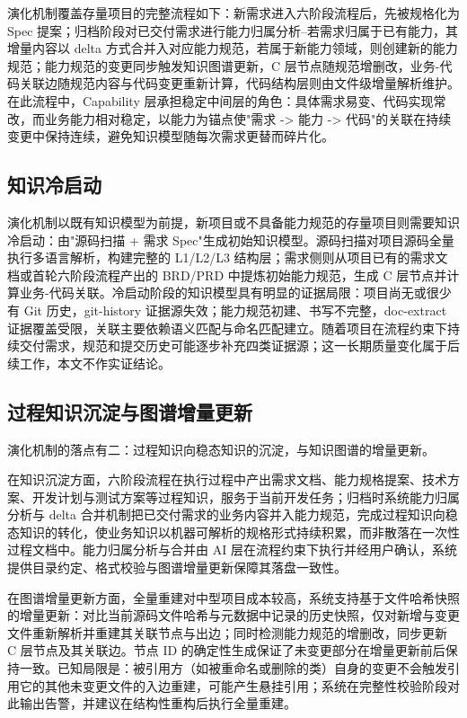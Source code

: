 演化机制覆盖存量项目的完整流程如下：新需求进入六阶段流程后，先被规格化为 Spec 提案；归档阶段对已交付需求进行能力归属分析--若需求归属于已有能力，其增量内容以 delta 方式合并入对应能力规范，若属于新能力领域，则创建新的能力规范；能力规范的变更同步触发知识图谱更新，C 层节点随规范增删改，业务-代码关联边随规范内容与代码变更重新计算，代码结构层则由文件级增量解析维护。在此流程中，Capability 层承担稳定中间层的角色：具体需求易变、代码实现常改，而业务能力相对稳定，以能力为锚点使"需求 -> 能力 -> 代码"的关联在持续变更中保持连续，避免知识模型随每次需求更替而碎片化。


\subsection{知识冷启动}
演化机制以既有知识模型为前提，新项目或不具备能力规范的存量项目则需要知识冷启动：由"源码扫描 + 需求 Spec"生成初始知识模型。源码扫描对项目源码全量执行多语言解析，构建完整的 L1/L2/L3 结构层；需求侧则从项目已有的需求文档或首轮六阶段流程产出的 BRD/PRD 中提炼初始能力规范，生成 C 层节点并计算业务-代码关联。冷启动阶段的知识模型具有明显的证据局限：项目尚无或很少有 Git 历史，git-history 证据源失效；能力规范初建、书写不完整，doc-extract 证据覆盖受限，关联主要依赖语义匹配与命名匹配建立。随着项目在流程约束下持续交付需求，规范和提交历史可能逐步补充四类证据源；这一长期质量变化属于后续工作，本文不作实证结论。


\subsection{过程知识沉淀与图谱增量更新}
演化机制的落点有二：过程知识向稳态知识的沉淀，与知识图谱的增量更新。

在知识沉淀方面，六阶段流程在执行过程中产出需求文档、能力规格提案、技术方案、开发计划与测试方案等过程知识，服务于当前开发任务；归档时系统能力归属分析与 delta 合并机制把已交付需求的业务内容并入能力规范，完成过程知识向稳态知识的转化，使业务知识以机器可解析的规格形式持续积累，而非散落在一次性过程文档中。能力归属分析与合并由 AI 层在流程约束下执行并经用户确认，系统提供目录约定、格式校验与图谱增量更新保障其落盘一致性。

在图谱增量更新方面，全量重建对中型项目成本较高，系统支持基于文件哈希快照的增量更新：对比当前源码文件哈希与元数据中记录的历史快照，仅对新增与变更文件重新解析并重建其关联节点与出边；同时检测能力规范的增删改，同步更新 C 层节点及其关联边。节点 ID 的确定性生成保证了未变更部分在增量更新前后保持一致。已知局限是：被引用方（如被重命名或删除的类）自身的变更不会触发引用它的其他未变更文件的入边重建，可能产生悬挂引用；系统在完整性校验阶段对此输出告警，并建议在结构性重构后执行全量重建。

